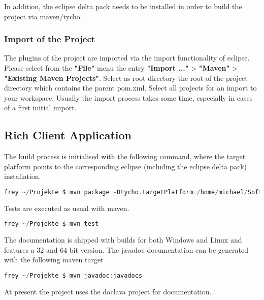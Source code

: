 In addition, the eclipse delta pack needs to be installed in order to build the 
project via maven/tycho.
 
\subsubsection{Import of the Project}
The plugins of the project are imported via the import functionality of eclipse.
Please select from the \textbf{"File"} menu the entry \textbf{"Import ..."} > 
\textbf{"Maven"} > \textbf{"Existing Maven Projects"}. Select as root
directory the root of the project directory which contains the parent pom.xml. 
Select all projects for an import to your workspace. Usually the import process
takes some time, especially in cases of a first initial import. 

\subsection{Rich Client Application}
The build process is initialised with the following command, where the target 
platform points to the corresponding eclipse (including the eclipse delta pack) 
installation.
\begin{lstlisting}[language=C, caption={\emph{bla}},label={lst:shell}]
frey ~/Projekte $ mvn package -Dtycho.targetPlatform=/home/michael/Software/eclipse
\end{lstlisting}
Tests are executed as usual with maven.
\begin{lstlisting}[language=C, caption={\emph{bla}},label={lst:shell}]
frey ~/Projekte $ mvn test
\end{lstlisting}
The documentation is shipped with builds for both Windows and Linux and features
a 32 and 64 bit version. The javadoc documentation can be generated with the 
following maven target
\begin{lstlisting}[language=C, caption={\emph{bla}},label={lst:shell}]
frey ~/Projekte $ mvn javadoc:javadocs
\end{lstlisting}
At present the project uses the doclava project for documentation.


